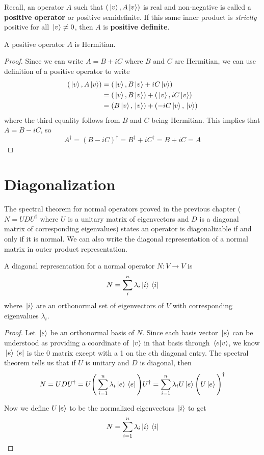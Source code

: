 Recall, an operator $A$ such that $(\ket*{v}, A\ket*{v})$ is real and non-negative is called a \textbf{positive operator} or positive semidefinite. If this same inner product is \textit{strictly} positive for all $\ket*{v} \neq 0$, then $A$ is \textbf{positive definite}. 

\begin{theorem} 
A positive operator $A$ is Hermitian. 
\end{theorem} 

\begin{proof}
Since we can write $A = B + iC$ where $B$ and $C$ are Hermitian, we can use definition of a positive operator to write 
$$
\begin{aligned}
(\ket*{v}, A \ket*{v}) &= (\ket*{v}, B\ket*{v} +iC\ket*{v}) \\ 
&= (\ket*{v}, B\ket*{v}) + (\ket*{v}, iC\ket*{v}) \\
&= (B\ket*{v}, \ket*{v}) + (-iC\ket*{v}, \ket*{v}) 
\end{aligned}
$$
where the third equality follows from $B$ and $C$ being Hermitian. This implies that $A = B - iC$, so  
$$A^{\dagger} = (B - iC)^{\dagger} = B^{\dagger} + i C^{\dagger} = B + iC = A$$
\end{proof}

\section{Diagonalization}

The spectral theorem for normal operators proved in the previous chapter ($N = UDU^{\dagger}$ where $U$ is a unitary matrix of eigenvectors and $D$ is a diagonal matrix of corresponding eigenvalues) states an operator is diagonalizable if and only if it is normal. We can also write the diagonal representation of a normal matrix in outer product representation.  

\begin{theorem}
A diagonal representation for a normal operator $N: V \rightarrow V$ is 
$$N = \sum_{i}^{n} \lambda_{i} \ket*{i} \bra*{i}$$
where $\ket*{i}$ are an orthonormal set of eigenvectors of $V$ with corresponding eigenvalues $\lambda_{i}$. 
\end{theorem}

\begin{proof}
Let $\ket*{e}$ be an orthonormal basis of $N$. Since each basis vector $\ket*{e}$ can be understood as providing a coordinate of $\ket*{v}$ in that basis through $\bra*{e}\ket*{v}$, we know $\ket*{e}\bra*{e}$ is the 0 matrix except with a 1 on the $e$th diagonal entry. The spectral theorem tells us that if $U$ is unitary and $D$ is diagonal, then 
$$N = UDU^{\dagger} = U \Bigg( \sum_{i=1}^{n} \lambda_{i} \ket*{e}\bra*{e} \Bigg) U^{\dagger} = \sum_{i=1}^{n} \lambda_{i} U \ket*{e} \Bigg( U \ket*{e} \Bigg)^{\dagger}$$

Now we define $U \ket*{e}$ to be the normalized eigenvectors $\ket*{i}$ to get 
$$N = \sum_{i=1}^{n} \lambda_{i} \ket*{i} \bra*{i}$$
\end{proof}

